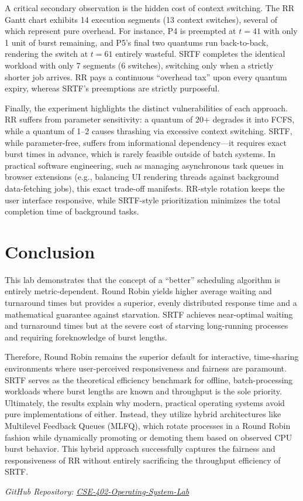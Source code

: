 \documentclass[12pt, a4paper]{article}
\begin{document}
A critical secondary observation is the hidden cost of context switching. The RR Gantt chart exhibits 14 execution segments (13 context switches), several of which represent pure overhead. For instance, P4 is preempted at $t=41$ with only 1 unit of burst remaining, and P5's final two quantums run back-to-back, rendering the switch at $t=61$ entirely wasteful. SRTF completes the identical workload with only 7 segments (6 switches), switching only when a strictly shorter job arrives. RR pays a continuous ``overhead tax'' upon every quantum expiry, whereas SRTF's preemptions are strictly purposeful.

Finally, the experiment highlights the distinct vulnerabilities of each approach. RR suffers from parameter sensitivity: a quantum of 20+ degrades it into FCFS, while a quantum of 1--2 causes thrashing via excessive context switching. SRTF, while parameter-free, suffers from informational dependency---it requires exact burst times in advance, which is rarely feasible outside of batch systems. In practical software engineering, such as managing asynchronous task queues in browser extensions (e.g., balancing UI rendering threads against background data-fetching jobs), this exact trade-off manifests. RR-style rotation keeps the user interface responsive, while SRTF-style prioritization minimizes the total completion time of background tasks.

\section*{Conclusion}
This lab demonstrates that the concept of a ``better'' scheduling algorithm is entirely metric-dependent. Round Robin yields higher average waiting and turnaround times but provides a superior, evenly distributed response time and a mathematical guarantee against starvation. SRTF achieves near-optimal waiting and turnaround times but at the severe cost of starving long-running processes and requiring foreknowledge of burst lengths. 

Therefore, Round Robin remains the superior default for interactive, time-sharing environments where user-perceived responsiveness and fairness are paramount. SRTF serves as the theoretical efficiency benchmark for offline, batch-processing workloads where burst lengths are known and throughput is the sole priority. Ultimately, the results explain why modern, practical operating systems avoid pure implementations of either. Instead, they utilize hybrid architectures like Multilevel Feedback Queues (MLFQ), which rotate processes in a Round Robin fashion while dynamically promoting or demoting them based on observed CPU burst behavior. This hybrid approach successfully captures the fairness and responsiveness of RR without entirely sacrificing the throughput efficiency of SRTF.

\vfill
\begin{center}
    \textit{GitHub Repository: \href{https://github.com/MasfiRahman/CSE-402-Operating-System-Lab-.git}{CSE-402-Operating-System-Lab}}
\end{center}
\end{document}
